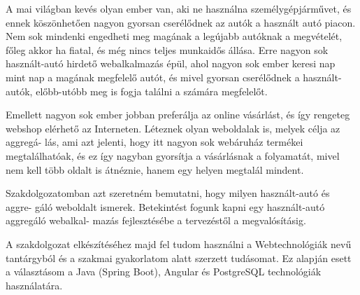 
A mai világban kevés olyan ember van, aki ne használna személygépjárművet, és ennek köszönhetően nagyon gyorsan cserélődnek az autók a használt autó piacon. Nem sok mindenki engedheti meg magának a legújabb autóknak a megvételét, főleg akkor ha fiatal, és még nincs teljes munkaidős állása. Erre nagyon sok használt-autó hirdető webalkalmazás épül, ahol nagyon sok ember keresi nap mint nap a magának megfelelő autót, és mivel gyorsan cserélődnek a használt-autók, előbb-utóbb meg is fogja találni a számára megfelelőt.

Emellett nagyon sok ember jobban preferálja az online vásárlást, és így rengeteg webshop elérhető az Interneten. Léteznek olyan weboldalak is, melyek célja az aggregá-
lás, ami azt jelenti, hogy itt nagyon sok webáruház termékei megtalálhatóak, és ez így nagyban gyorsítja a vásárlásnak a folyamatát, mivel nem kell több oldalt is átnéznie, hanem egy helyen megtalál mindent.

Szakdolgozatomban azt szeretném bemutatni, hogy milyen használt-autó és aggre-
gáló weboldalt ismerek. Betekintést fogunk kapni egy használt-autó aggregáló webalkal-
mazás fejlesztésébe a tervezéstől a megvalósításig. 

A szakdolgozat elkészítéséhez majd fel tudom használni a Webtechnológiák nevű tantárgyból és a szakmai gyakorlatom alatt szerzett tudásomat. Ez alapján esett a választásom a Java (Spring Boot), Angular és PostgreSQL technológiák használatára.